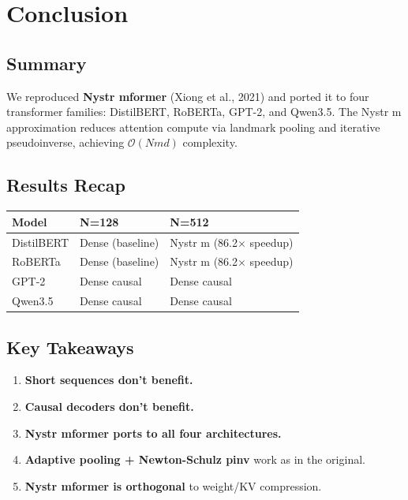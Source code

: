 \section{Conclusion}

\subsection{Summary}

We reproduced \textbf{Nystr mformer} (Xiong et al., 2021) and ported it to 
four transformer families: DistilBERT, RoBERTa, GPT-2, and Qwen3.5. 
The Nystr m approximation reduces attention compute via landmark pooling 
and iterative pseudoinverse, achieving $\mathcal{O}(N m d)$ complexity.

\subsection{Results Recap}

\begin{table}[H]
\centering
\small
\begin{tabular}{lll}
\toprule
\textbf{Model} & \textbf{N=128} & \textbf{N=512} \\
\midrule
DistilBERT & Dense (baseline) & Nystr m (86.2$\times$ speedup) \\
RoBERTa & Dense (baseline) & Nystr m (86.2$\times$ speedup) \\
GPT-2 & Dense causal & Dense causal \\
Qwen3.5 & Dense causal & Dense causal \\
\bottomrule
\end{tabular}
\end{table}

\subsection{Key Takeaways}

\begin{enumerate}
\item \textbf{Short sequences don't benefit.}
\item \textbf{Causal decoders don't benefit.}
\item \textbf{Nystr mformer ports to all four architectures.}
\item \textbf{Adaptive pooling + Newton-Schulz pinv} work as in the original.
\item \textbf{Nystr mformer is orthogonal} to weight/KV compression.

\end{enumerate}
